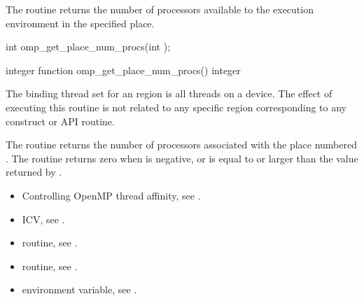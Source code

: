 \summary
The   routine returns the number of processors available to the execution environment in the specified place.

\format
\begin{ccppspecific}
\begin{ompcFunction}
int omp_get_place_num_procs(int );
\end{ompcFunction}
\end{ccppspecific}

\begin{fortranspecific}
\begin{ompfFunction}
integer function omp_get_place_num_procs()
integer 
\end{ompfFunction}
\end{fortranspecific}

\binding
The binding thread set for an   region is all threads on a device. The effect of executing this routine is not related to any specific region corresponding to any construct or API routine.

\effect
The  routine returns the number of
processors associated with the place numbered . The
routine returns zero when  is negative, or is equal
to or larger than the value returned by .

\crossreferences
\begin{itemize}

\item Controlling OpenMP thread affinity, see
.

\item {} ICV, see
.

\item {} routine, see
.

\item {} routine, see
.

\item {} environment variable, see
.
\end{itemize}




\subsection{}
\label{subsec:omp_get_place_proc_ids}

